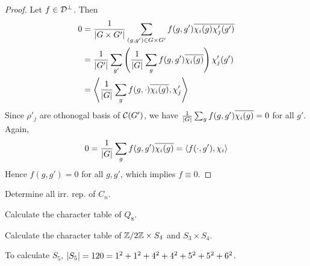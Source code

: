 \begin{theorem}
\begin{proof}
  Let $f \in \Dc^\perp$. Then
  \begin{align*}
    0 &= \frac{1}{\abs{G\times G'}} \sum_{(g,g')\in G\times G'}
    f(g,g')\ob{\chi_i(g)\chi_j'(g')} \\
    &= \frac{1}{\abs{G'}} \sum_{g'} \left( \frac{1}{\abs{G}}\sum_g f(g, g') \ob{\chi_i(g)} \right) \chi'_j(g') \\
    &= \gen*{ \frac{1}{\abs{G}} \sum_g f(g, \cdot) \ob{\chi_i(g)}, \chi'_j }
  \end{align*}
  Since $\rho'_j$ are othonogal basis of $\Cc(G')$, we have $\frac{1}{\abs{G}} \sum_g f(g, g') \ob{\chi_i(g)}
  = 0$ for all $g'$.
  Again,
  \[ 0 = \frac{1}{\abs{G}} \sum_g f(g, g') \ob{\chi_i(g)} = \inpd{f(\cdot, g'), \chi_i} \]
  Hence $f(g, g') = 0$ for all $g, g'$, which implies $f \equiv 0$.
\end{proof}

\end{theorem}

\begin{exercise}
  Determine all irr. rep. of $C_n$.
\end{exercise}

\begin{exercise}
  Calculate the character table of $Q_8$.
\end{exercise}

\begin{exercise}
  Calculate the character table of $\quot{\Zb}{2\Zb}\times S_4$ and
  $S_3\times S_4$.
\end{exercise}

To calculate $S_5$, $\abs{S_5} = 120 = 1^2 + 1^2 + 4^2 + 4^2 + 5^2 + 5^2 + 6^2$.
